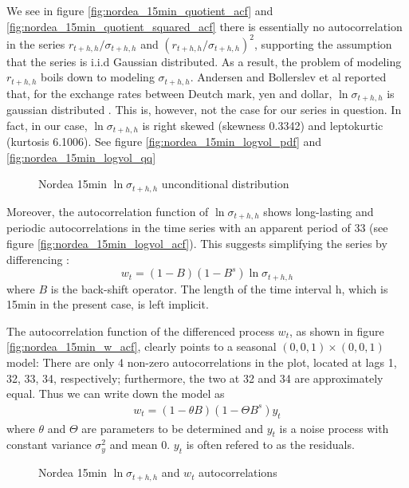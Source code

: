 \documentclass{book}
\begin{document}
We see in figure \ref{fig:nordea_15min_quotient_acf} and
\ref{fig:nordea_15min_quotient_squared_acf} there is essentially no
autocorrelation in the series $r_{t+h, h} / \sigma_{t+h, h}$ and
$(r_{t+h, h} / \sigma_{t+h, h})^2$, supporting the assumption that the
series is i.i.d Gaussian distributed. As a result, the problem of
modeling $r_{t+h, h}$ boils down to modeling $\sigma_{t+h,
  h}$. Andersen and Bollerslev et al reported that, for the exchange
rates between Deutch mark, yen and dollar, $\ln \sigma_{t+h, h}$ is
gaussian distributed \cite{Andersen03}. This is, however, not the case
for our series in question. In fact, in our case, $\ln \sigma_{t+h,
  h}$ is right skewed (skewness 0.3342) and leptokurtic (kurtosis
6.1006). See figure \ref{fig:nordea_15min_logvol_pdf} and
\ref{fig:nordea_15min_logvol_qq}
\begin{figure}[htb!]
  \centering
  \caption{\footnotesize Nordea 15min $\ln\sigma_{t+h, h}$ unconditional
    distribution}
\end{figure}

Moreover, the autocorrelation function of $\ln\sigma_{t+h, h}$
shows long-lasting and periodic autocorrelations in the time series
with an apparent period of 33 (see figure
\ref{fig:nordea_15min_logvol_acf}). This suggests simplifying the
series by differencing \cite{BoxJenkins94}:
\[
w_t = (1-B)(1-B^s)\ln\sigma_{t+h, h}
\]
where $B$ is the back-shift operator. The length of the time interval
h, which is 15min in the present case, is left implicit.

The autocorrelation function of the differenced process $w_t$, as shown in
figure \ref{fig:nordea_15min_w_acf}, clearly points to a seasonal $(0,
0, 1)\times(0, 0, 1)$ model: There are only 4 non-zero
autocorrelations in the plot, located at lags 1, 32, 33, 34,
respectively; furthermore, the two at 32 and 34 are approximately
equal. Thus we can write down the model as
\begin{eqnarray*}
  w_t = (1 - \theta B)(1 - \Theta B^s) y_t
\end{eqnarray*}
where $\theta$ and $\Theta$ are parameters to be determined and $y_t$
is a noise process with constant variance $\sigma_y^2$ and mean
0. $y_t$ is often refered to as the residuals.
\begin{figure}[htb!]
  \centering
  \caption{\footnotesize Nordea 15min $\ln\sigma_{t+h, h}$ and $w_t$ autocorrelations}
\end{figure}
\end{document}
